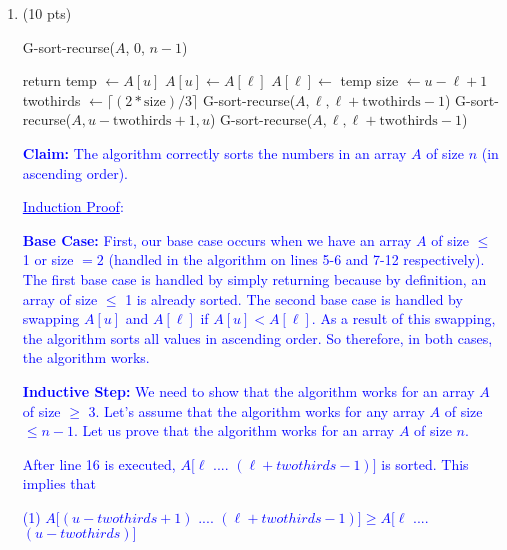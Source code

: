 \documentclass[11pt]{article}
\begin{document}
\begin{enumerate}

\item (10 pts) \- \
\begin{algorithmic}[1]
 
	\State G-sort-recurse($A$, 0, $n-1$)
\EndFunction

\If {$u - \ell \leq 0$} 
	\State return 
 
	 
		\State  temp $\gets A[u]$
		\State $A[u] \gets A[\ell]$
		\State $A[\ell] \gets$ temp
	\EndIf
\Else {}
\State size $\gets u - \ell + 1$
\State twothirds $\gets \lceil (2 * \mbox{size})  / 3 \rceil$
\State G-sort-recurse($A, \ell, \ell + \mbox{twothirds} - 1$)
\State G-sort-recurse($A, u - \mbox{twothirds}+1 , u$)
\State G-sort-recurse($A, \ell, \ell + \mbox{twothirds} - 1$)
\EndIf 
\EndFunction
\end{algorithmic}

\textcolor{blue}{ {\bf Claim:} The algorithm correctly sorts the numbers in an array $A$ of size $n$ (in ascending order).}

\textcolor{blue}{ \underline{Induction Proof}:}

\textcolor{blue}{ {\bf Base Case:} First, our base case occurs when we have an array $A$ of size $\leq$ 1 or size $= 2$ (handled in the algorithm on lines 5-6 and 7-12 respectively). The first base case is handled by simply returning because by definition, an array of size $\leq$ 1 is already sorted. The second base case is handled by swapping $A[u]$ and $A[\ell]$ if $A[u] < A[\ell]$. As a result of this swapping, the algorithm sorts all values in ascending order. So therefore, in both cases, the algorithm works.}

\textcolor{blue}{ {\bf Inductive Step:} We need to show that the algorithm works for an array $A$ of size $\geq$ 3. Let's assume that the algorithm works for any array $A$ of size $\leq n-1$. Let us prove that the algorithm works for an array $A$ of size $n$.}

\textcolor{blue}{ After line 16 is executed, $A[\ell$ .... $(\ell + twothirds - 1)]$ is sorted. This implies that}

\textcolor{blue}{ (1) $A[(u - twothirds + 1)$ .... $(\ell + twothirds - 1)] \geq A[\ell$ .... $(u - twothirds)]$}


\end{enumerate}
\end{document}
